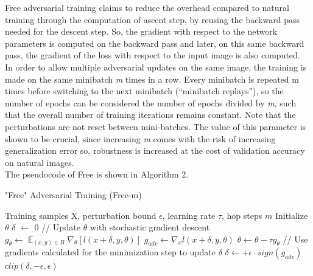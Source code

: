 \documentclass{article}
\DeclareMathOperator{\EX}{\mathbb{E}}%
\begin{document}
Free adversarial training \cite{ShafahiEtAl2019b} claims to reduce the overhead compared to natural training through the computation of ascent step, by reusing the backward pass needed for the descent step. So, the gradient with respect to the network parameters is computed on the backward pass and later, on this same backward pass, the gradient of the loss with respect to the input image is also computed.\\
In order to allow multiple adversarial updates on the same image, the training is made on the same minibatch \textit{m} times in a row. Every minibatch is repeated m times before switching to the next minibatch (“minibatch replays”), so the number of epochs can be considered the number of epochs divided by \textit{m}, such that the overall number of training iterations remains constant. Note that the perturbations are not reset between mini-batches. The value of this parameter is shown to be crucial, since increasing \textit{m} comes with the risk of increasing generalization error so, robustness is increased at the cost of validation accuracy on natural images.\\
The pseudocode of Free is shown in Algorithm 2.

\begin{algorithm}[H]
	\caption{"Free" Adversarial Training (Free-m)}
	\begin{algorithmic}[1]
		\Require Training samples X, perturbation bound $\epsilon$, learning rate $\tau$, hop steps $m$
		\State Initialize $\theta$
		\State $\delta$ $\leftarrow$ 0
		\State // Update $\theta$ with stochastic gradient descent
		\State $g_{\theta} \leftarrow \EX_{(x,y) \in B} \nabla_{\theta} [l(x+\delta, y, \theta)]$
		\State $g_{adv} \leftarrow \nabla_{x} l(x+\delta, y, \theta)$
		\State $\theta \leftarrow \theta - \tau g_{\theta}$
		\State // Use gradients calculated for the minimization step to update $\delta$
		\State $\delta \leftarrow + \epsilon \cdot sign(g_{adv})$
		\State $clip(\delta, -\epsilon, \epsilon)$
		\EndFor
		\EndFor
		\EndFor
	\end{algorithmic}
\end{algorithm}
\end{document}
